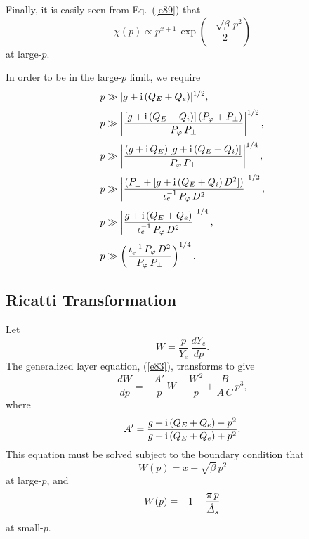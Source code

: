 \documentclass[titlepage=false,12pt]{article}
\begin{document}
Finally, it is easily seen from Eq.~(\ref{e89}) that
\begin{equation}
\chi(p) \propto p^{x+1}\,\exp\left(\frac{-\sqrt{\beta}\,p^2}{2}\right)
\end{equation}
at large-$p$. 

In order to be in the large-$p$ limit, we require
\begin{align}
p&\gg |g+{\rm i}\,(Q_E+Q_e)|^{1/2},\\[0.5ex]
p&\gg\left|\frac{[g+{\rm i}\,(Q_E+Q_i)]\,(P_\varphi + P_\perp)}{P_\varphi\,P_\perp}\right|^{1/2},\\[0.5ex]
p&\gg \left|\frac{(g+{\rm i}\,Q_E)\,[g+{\rm i}\,(Q_E+Q_i)]}{P_\varphi\,P_\perp}\right|^{1/4},\\[0.5ex]
p&\gg \left|\frac{(P_\perp+[g+{\rm i}\,(Q_E+Q_i)\,D^2])}{\iota_e^{-1}\,P_\varphi\,D^2}\right|^{1/2},\\[0.5ex]
p&\gg \left|\frac{g+{\rm i}\,(Q_E+Q_e)}{\iota_e^{-1}\,P_\varphi\,D^2}\right|^{1/4},\\[0.5ex]
p&\gg \left(\frac{\iota_e^{-1}\,P_\varphi\,D^2}{P_\varphi\,P_\perp}\right)^{1/4}.
\end{align} 

\subsection{Ricatti Transformation}
Let 
\begin{equation}
W= \frac{p}{Y_e}\,\frac{dY_e}{dp}.
\end{equation}
The generalized layer equation, (\ref{e83}), transforms to give
\begin{equation}\label{e72a}
\frac{dW}{dp} =- \frac{A'}{p}\,W -\frac{W^{\,2}}{p} + \frac{B}{A\,C}\,p^3,
\end{equation}
where
\begin{equation}
A' = \frac{g+{\rm i}\,(Q_E+Q_e)-p^2}{g+{\rm i}\,(Q_E+Q_e)+p^2}.
\end{equation}
This equation must be solved subject to the boundary condition that
\begin{equation}\label{e63a}
W(p) = x-\sqrt{\beta}\,p^2
\end{equation}
at large-$p$, and
\begin{equation}\label{e73a}
W (p)=-1+\frac{\pi\,p}{\hat{\mit\Delta}_s}
\end{equation}
at small-$p$. 
\end{document}
